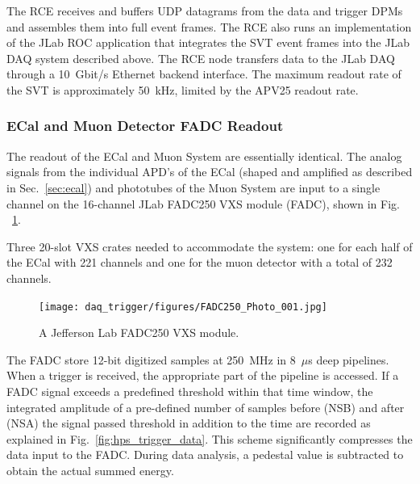 The RCE receives and buffers UDP datagrams from the data and trigger DPMs and
 assembles them into full event frames. The RCE also runs an implementation of the JLab ROC application 
that integrates the SVT event frames into the JLab DAQ 
 system described above. The RCE node transfers data to the JLab DAQ  
 through a 10~Gbit/s Ethernet backend interface. The maximum readout rate of the SVT is approximately 50~kHz, limited by the APV25 readout rate. 










\subsubsection{ECal and Muon Detector FADC Readout}
\label{sec:fadc_daq}
The readout of the ECal and Muon System are essentially identical. 
The analog signals from the individual APD's of the ECal (shaped and amplified as described in Sec.~\ref{sec:ecal}) and phototubes of the Muon System are input to a single channel on the 16-channel JLab FADC250 VXS module (FADC), shown in Fig. ~\ref{fig:fadc}. 

Three 20-slot VXS crates needed to accommodate the system: one for each half of the ECal with 221 channels and one for the muon detector with a total of 232 channels.

\begin{figure}[t]
\texttt{[image: daq\_trigger/figures/FADC250\_Photo\_001.jpg]}
\caption{\small{A Jefferson Lab FADC250 VXS module.}}
\label{fig:fadc}
\end{figure}

The FADC store 12-bit digitized samples at 250~MHz in 8~$\mu$s deep pipelines. 
When a trigger is received, the appropriate part of the pipeline is accessed. If a FADC   
signal exceeds a predefined threshold within that time window, the integrated amplitude of a pre-defined  number of samples before (NSB) and after (NSA) the signal passed threshold in addition to the time are recorded as explained in Fig.~\ref{fig:hps_trigger_data}. This scheme significantly compresses the data input to the FADC. During data analysis, a pedestal value is subtracted to obtain the actual summed energy.

